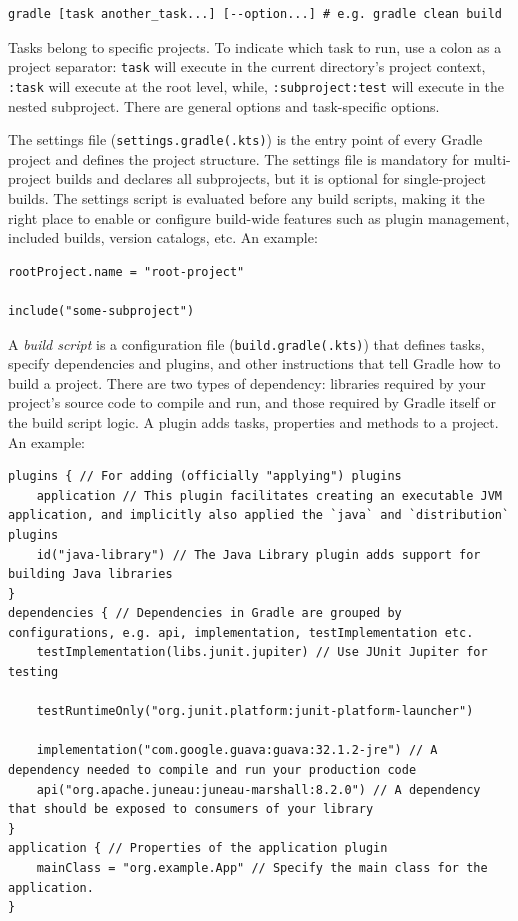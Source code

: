 \documentclass[table, xcdraw]{article}%
\begin{document}
\begin{verbatim}
gradle [task another_task...] [--option...] # e.g. gradle clean build
\end{verbatim}

Tasks belong to specific projects. To indicate which task to run, use a colon as a project separator: \texttt{task} will execute in the current directory’s project context, \texttt{:task} will execute at the root level, while, \texttt{:subproject:test} will execute in the nested subproject. There are general options and task-specific options.

The settings file (\texttt{settings.gradle(.kts)}) is the entry point of every Gradle project and defines the project structure. The settings file is mandatory for multi-project builds and declares all subprojects, but it is optional for single-project builds. The settings script is evaluated before any build scripts, making it the right place to enable or configure build-wide features such as plugin management, included builds, version catalogs, etc. An example:

\begin{verbatim}
rootProject.name = "root-project" 

include("some-subproject") 
\end{verbatim}

A \emph{build script} is a configuration file (\texttt{build.gradle(.kts)}) that defines tasks, specify dependencies and plugins, and other instructions that tell Gradle how to build a project. There are two types of dependency: libraries required by your project's source code to compile and run, and those required by Gradle itself or the build script logic. A plugin adds tasks, properties and methods to a project. An example:

\begin{verbatim}
plugins { // For adding (officially "applying") plugins
    application // This plugin facilitates creating an executable JVM application, and implicitly also applied the `java` and `distribution` plugins
    id("java-library") // The Java Library plugin adds support for building Java libraries
}
dependencies { // Dependencies in Gradle are grouped by configurations, e.g. api, implementation, testImplementation etc.
    testImplementation(libs.junit.jupiter) // Use JUnit Jupiter for testing

    testRuntimeOnly("org.junit.platform:junit-platform-launcher")

    implementation("com.google.guava:guava:32.1.2-jre") // A dependency needed to compile and run your production code
    api("org.apache.juneau:juneau-marshall:8.2.0") // A dependency that should be exposed to consumers of your library
}
application { // Properties of the application plugin
    mainClass = "org.example.App" // Specify the main class for the application.
}
\end{verbatim}
\end{document}
